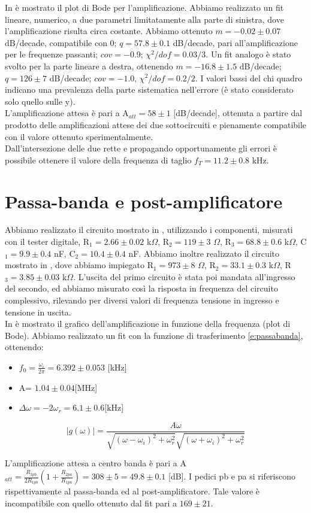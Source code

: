 In  è mostrato il plot di Bode per l'amplificazione. Abbiamo realizzato un fit lineare, numerico, a due parametri limitatamente alla parte di sinistra, dove l'amplificazione risulta circa costante. Abbiamo ottenuto $m = -0.02 \pm 0.07$ dB/decade, compatibile con 0; $q = 57.8 \pm 0.1$ dB/decade, pari all'amplificazione per le frequenze passanti; $cov = -0.9$; $ \chi ^2/dof = 0.03/3$. Un fit analogo è stato svolto per la parte lineare a destra, ottenendo $m = -16.8 \pm 1.5$ dB/decade; $q = 126 \pm 7$ dB/decade; $cov = -1.0$, $ \chi ^2/dof = 0.2/2$. I valori bassi del chi quadro indicano una prevalenza della parte sistematica nell'errore (è stato considerato solo quello sulle y).\\
L'amplificazione attesa è pari a A$_{att} = 58 \pm 1$ [dB/decade], ottenuta a partire dal prodotto delle amplificazioni attese dei due sottocircuiti e pienamente compatibile con il valore ottenuto sperimentalmente.\\
Dall'intersezione delle due rette e propagando opportunamente gli errori è possibile ottenere il valore della frequenza di taglio $f_T = 11.2 \pm 0.8$ kHz.

\section{Passa-banda e post-amplificatore}
Abbiamo realizzato il circuito mostrato in , utilizzando i componenti, misurati con il tester digitale, R$_1 = 2.66 \pm 0.02$ k$\Omega$, R$_2 = 119 \pm 3$ $\Omega$, R$_3 = 68.8 \pm 0.6$ k$\Omega$, C$_1 = 9.9 \pm 0.4$ nF, C$_2 = 10.4 \pm 0.4$ nF. Abbiamo inoltre realizzato il circuito mostrato in , dove abbiamo impiegato R$_1 = 973 \pm 8$ $\Omega$, R$_2 = 33.1 \pm 0.3$ k$\Omega$, R$_3 = 3.85 \pm 0.03$ k$\Omega$. L'uscita del primo circuito è stata poi mandata all'ingresso del secondo, ed abbiamo misurato così la risposta in frequenza del circuito complessivo, rilevando per diversi valori di frequenza tensione in ingresso e tensione in uscita.\\
In  è mostrato il grafico dell'amplificazione in funzione della frequenza (plot di Bode). Abbiamo realizzato un fit con la funzione di trasferimento \ref{e:passabanda}, ottenendo:
\begin{itemize}
\item $f_0=\frac{\omega_i}{2\pi}= 6.392 \pm 0.053$ [kHz]
\item A= $1.04 \pm 0.04$[MHz]
\item $\Delta \omega =-2\omega_r= 6.1 \pm 0.6$[kHz]
\end{itemize}

\begin{equation}
|g(\omega)| = \frac{A\omega}{ \sqrt{(\omega-\omega_i)^2 + \omega_r^2} \sqrt{(\omega+\omega_i)^2 + \omega_r^2}}
\label{e:passabanda}
\end{equation}

L'amplificazione attesa a centro banda è pari a A$_{att} = \frac{R_{3pb}}{2R_{1pb}} (1+\frac{R_{2pa}}{R_{1pa}}) = 308 \pm 5 = 49.8 \pm 0.1$ [dB]. I pedici pb e pa si riferiscono rispettivamente al passa-banda ed al post-amplificatore. Tale valore è incompatibile con quello ottenuto dal fit pari a $169 \pm 21$.